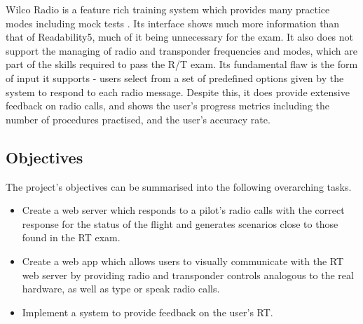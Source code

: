 Wilco Radio is a feature rich training system which provides many practice modes including mock tests \cite{Wilco-Radio}. Its interface shows much more information than that of Readability5, much of it being unnecessary for the exam. It also does not support the managing of radio and transponder frequencies and modes, which are part of the skills required to pass the R/T exam. Its fundamental flaw is the form of input it supports - users select from a set of predefined options given by the system to respond to each radio message. Despite this, it does provide extensive feedback on radio calls, and shows the user's progress metrics including the number of procedures practised, and the user's accuracy rate.

\subsection{Objectives}
The project's objectives can be summarised into the following overarching tasks.

\begin{itemize}
    \item Create a web server which responds to a pilot's radio calls with the correct response for the status of the flight and generates scenarios close to those found in the RT exam.
    \item Create a web app which allows users to visually communicate with the RT web server by providing radio and transponder controls analogous to the real hardware, as well as type or speak radio calls.
    \item Implement a system to provide feedback on the user's RT.
\end{itemize}
